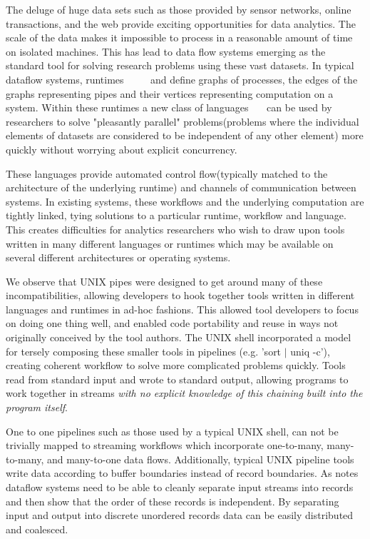The deluge of huge data sets such as those provided by sensor
networks, online transactions, and the web provide exciting
opportunities for data analytics.  The scale of the data makes it
impossible to process in a reasonable amount of time on isolated
machines.  This has lead to data flow systems emerging
as the standard tool for solving research problems using these vast
datasets.  In typical dataflow systems,
runtimes~\cite{dean2008msd}~\cite{bialecki:hfr}~\cite{isard2007ddd}
~\cite{streamit} and  define graphs of processes, the edges of the graphs
representing pipes and their vertices representing computation on a
system.  Within these runtimes a new class of
languages~\cite{pike2005idp}~\cite{yu2008dsg}~\cite{olston2008pln} can
be used by researchers to solve "pleasantly parallel" problems(problems where the individual elements of datasets are considered
to be independent of any other element) more quickly without worrying
about explicit concurrency.

These languages provide automated control flow(typically matched
to the architecture of the underlying runtime) and channels of
communication between systems.  In existing systems, these workflows
and the underlying computation are tightly linked, tying solutions
to a particular runtime, workflow and language.  This creates
difficulties for analytics researchers who wish to draw upon tools
written in many different languages or runtimes which may be available
on several different architectures or operating systems.

We observe that UNIX pipes were designed to get around many of these
incompatibilities, allowing developers to hook together tools written
in different languages and runtimes in ad-hoc fashions.  This allowed
tool developers to focus on doing one thing well, and enabled code
portability and reuse in ways not originally conceived by the tool
authors.  The UNIX shell incorporated a model for tersely composing
these smaller tools in pipelines (e.g. 'sort $|$ uniq -c'), creating
coherent workflow to solve more complicated problems quickly.  Tools
read from standard input and wrote to standard output, allowing
programs to work together in streams \emph{with no explicit knowledge
of this chaining built into the program itself}.

One to one pipelines such as those used by a typical UNIX shell,
can not be trivially mapped to streaming workflows which incorporate
one-to-many, many-to-many, and many-to-one data flows.  Additionally,
typical UNIX pipeline tools write data according to buffer boundaries
instead of record boundaries.  As \cite{pike2005idp} notes dataflow
systems need to be able to cleanly separate input streams into
records and then show that the order of these records is independent.
By separating input and output into discrete unordered records data
can be easily distributed and coalesced.

